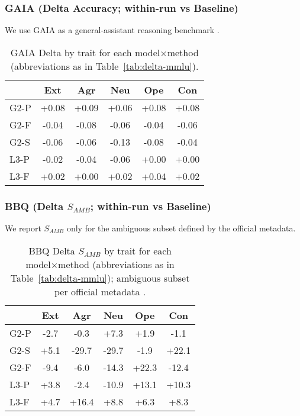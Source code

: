 \subsubsection{GAIA (Delta Accuracy; within-run vs Baseline)}
We use GAIA as a general-assistant reasoning benchmark \citep{mialon-etal-2023-gaia}.
\begin{table}[H]
\centering
\scriptsize
{\setlength{\tabcolsep}{2pt}\renewcommand{\arraystretch}{0.95}%
\begin{adjustbox}{max width=\linewidth}
\begin{tabular}{lSSSSS}
\toprule
& {Ext} & {Agr} & {Neu} & {Ope} & {Con} \\
\midrule
G2-P & +0.08 & +0.09 & +0.06 & +0.08 & +0.08 \\
G2-F & -0.04 & -0.08 & -0.06 & -0.04 & -0.06 \\
G2-S & -0.06 & -0.06 & -0.13 & -0.08 & -0.04 \\
L3-P & -0.02 & -0.04 & -0.06 & +0.00 & +0.00 \\
L3-F & +0.02 & +0.00 & +0.02 & +0.04 & +0.02 \\
\bottomrule
\end{tabular}
\end{adjustbox}}
\caption{GAIA Delta by trait for each model×method (abbreviations as in Table~\ref{tab:delta-mmlu}).}
\label{tab:delta-gaia}
\end{table}
\FloatBarrier

\subsubsection{BBQ (Delta $S_{AMB}$; within-run vs Baseline)}
We report $S_{AMB}$ only for the ambiguous subset defined by the official metadata.
\begin{table}[H]
\centering
\scriptsize
{\setlength{\tabcolsep}{2pt}\renewcommand{\arraystretch}{0.95}%
\begin{adjustbox}{max width=\linewidth}
\begin{tabular}{lSSSSS}
\toprule
& {Ext} & {Agr} & {Neu} & {Ope} & {Con} \\
\midrule
G2-P & -2.7 & -0.3 & +7.3 & +1.9 & -1.1 \\
G2-S & +5.1 & -29.7 & -29.7 & -1.9 & +22.1 \\
G2-F & -9.4 & -6.0 & -14.3 & +22.3 & -12.4 \\
L3-P & +3.8 & -2.4 & -10.9 & +13.1 & +10.3 \\
L3-F & +4.7 & +16.4 & +8.8 & +6.3 & +8.3 \\
\bottomrule
\end{tabular}
\end{adjustbox}}
\caption{BBQ Delta $S_{AMB}$ by trait for each model×method (abbreviations as in Table~\ref{tab:delta-mmlu}); ambiguous subset per official metadata \citep{parrish-etal-2022-bbq}.}
\label{tab:delta-bbq}
\end{table}
\FloatBarrier

